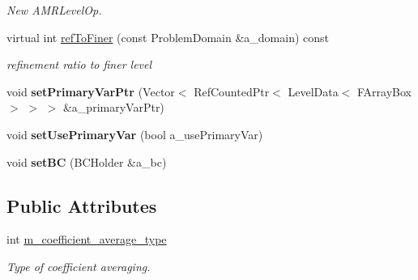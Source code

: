 \begin{DoxyCompactItemize}
\begin{DoxyCompactList}\small\item\em New A\-M\-R\-Level\-Op. \end{DoxyCompactList}\item 
\hypertarget{class_a_m_r_non_linear_multi_comp_op_factory_a0ef63f87a51d7a6b41906fb19b5f9159}{virtual int \hyperlink{class_a_m_r_non_linear_multi_comp_op_factory_a0ef63f87a51d7a6b41906fb19b5f9159}{ref\-To\-Finer} (const Problem\-Domain \&a\-\_\-domain) const }\label{class_a_m_r_non_linear_multi_comp_op_factory_a0ef63f87a51d7a6b41906fb19b5f9159}

\begin{DoxyCompactList}\small\item\em refinement ratio to finer level \end{DoxyCompactList}\item 
\hypertarget{class_a_m_r_non_linear_multi_comp_op_factory_a93acce1cf394f1bfcd607379483c3fea}{void {\bfseries set\-Primary\-Var\-Ptr} (Vector$<$ Ref\-Counted\-Ptr$<$ Level\-Data$<$ F\-Array\-Box $>$ $>$ $>$ \&a\-\_\-primary\-Var\-Ptr)}\label{class_a_m_r_non_linear_multi_comp_op_factory_a93acce1cf394f1bfcd607379483c3fea}

\item 
\hypertarget{class_a_m_r_non_linear_multi_comp_op_factory_a26cb81294d2e7f9e9ebe7b8fd65c9a97}{void {\bfseries set\-Use\-Primary\-Var} (bool a\-\_\-use\-Primary\-Var)}\label{class_a_m_r_non_linear_multi_comp_op_factory_a26cb81294d2e7f9e9ebe7b8fd65c9a97}

\item 
\hypertarget{class_a_m_r_non_linear_multi_comp_op_factory_acff316ce90ff199f95b6858790d30c31}{void {\bfseries set\-B\-C} (B\-C\-Holder \&a\-\_\-bc)}\label{class_a_m_r_non_linear_multi_comp_op_factory_acff316ce90ff199f95b6858790d30c31}

\end{DoxyCompactItemize}
\subsection*{Public Attributes}
\begin{DoxyCompactItemize}
\item 
\hypertarget{class_a_m_r_non_linear_multi_comp_op_factory_adbaf572b2b096b6a8ff502b943bd4c2f}{int \hyperlink{class_a_m_r_non_linear_multi_comp_op_factory_adbaf572b2b096b6a8ff502b943bd4c2f}{m\-\_\-coefficient\-\_\-average\-\_\-type}}\label{class_a_m_r_non_linear_multi_comp_op_factory_adbaf572b2b096b6a8ff502b943bd4c2f}

\begin{DoxyCompactList}\small\item\em Type of coefficient averaging. \end{DoxyCompactList}\end{DoxyCompactItemize}


